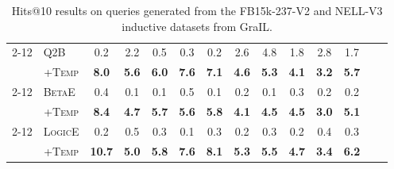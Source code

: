 \begin{table}[!htp]
\begin{tabular*}{\linewidth}{@{}cccccccccccccc@{}}
\cmidrule{2-12}
& \multicolumn{1}{l}{Q2B}    
& 0.2 	& 2.2  	 & 0.5 	  & 0.3   & 0.2 	& 2.6 	& 4.8 	& 1.8 	& 2.8 	& 1.7  \\
& \multicolumn{1}{c}{+\textsc{Temp}}  
& \textbf{8.0}   	& \textbf{5.6} 	    & \textbf{6.0} 	    & \textbf{7.6} 	
& \textbf{7.1} 	    & \textbf{4.6}  	& \textbf{5.3}   	& \textbf{4.1}
& \textbf{3.2} 	    & \textbf{5.7} \\
\cmidrule{2-12}
& \multicolumn{1}{l}{\textsc{BetaE}}
& 0.4 	& 0.1  	 & 0.1 	  & 0.5   & 0.1 	& 0.2 	& 0.1   & 0.3 
& 0.2 	& 0.2   \\
& \multicolumn{1}{c}{+\textsc{Temp}}  
& \textbf{8.4} 	& \textbf{4.7} 	& \textbf{5.7} 	& \textbf{5.6} 	& \textbf{5.8}
& \textbf{4.1} 	& \textbf{4.5} 	& \textbf{4.5} 	& \textbf{3.0} 	& \textbf{5.1} 
\\
\cmidrule{2-12}
& \multicolumn{1}{l}{\textsc{LogicE}}
& 0.2 	& 0.5  	 & 0.3 	  & 0.1   & 0.3 	& 0.2 	& 0.3 	& 0.2
& 0.4 	& 0.3   \\
& \multicolumn{1}{c}{+\textsc{Temp}}  
& \textbf{10.7} 	& \textbf{5.0} 	& \textbf{5.8} 	& \textbf{7.6} 	& \textbf{8.1} 
& \textbf{5.3} 	    & \textbf{5.5} 	& \textbf{4.7} 	& \textbf{3.4} 	& \textbf{6.2} 
\\
\bottomrule
\end{tabular*}
\caption{Hits@10 results on queries generated from the FB15k-237-V2 and NELL-V3 inductive datasets from GraIL.}
\label{table_2}
\end{table}
